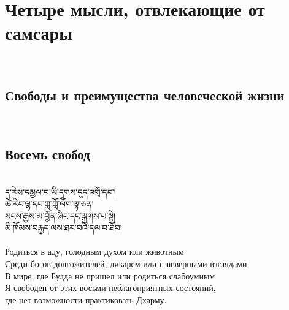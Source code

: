 \newpage
\section{Четыре мысли, отвлекающие от самсары}
\\
\subsection{Свободы и преимущества человеческой жизни}
\\
\subsection*{Восемь свобод}
\\
\ti
ད་རེས་དམྱལ་བ་ཡི་དྭགས་དུད་འགྲོ་དང༌།\\
ཚེ་རིང་ལྷ་དང་ཀླ་ཀློ་ལོག་ལྟ་ཅན།\\
སངས་རྒྱས་མ་བྱོན་ཞིང་དང་ལྐུགས་པ་སྟེ།\\
མི་ཁོམས་བརྒྱད་ལས་ཐར་བའི་དལ་བ་ཐོབ།\\
\\
\ru
Родиться в аду, голодным духом или животным\\
Среди богов-долгожителей, дикарем или с неверными взглядами\\
В мире, где Будда не пришел или родиться слабоумным\\
Я свободен от этих восьми неблагоприятных состояний,\\
где нет возможности практиковать Дхарму.\\

\newpage
